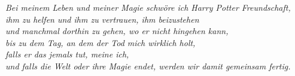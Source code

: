 \begin{center}
\noindent{}\emph{Bei meinem Leben und meiner Magie schwöre ich Harry Potter Freundschaft,\\
ihm zu helfen und ihm zu vertrauen, ihm beizustehen \\
und manchmal dorthin zu gehen, wo er nicht hingehen kann,\\
bis zu dem Tag, an dem der Tod mich wirklich holt, \\
falls er das jemals tut, meine ich,\\
und falls die Welt oder ihre Magie endet, werden wir damit gemeinsam fertig.}
\end{center}

\newpage

